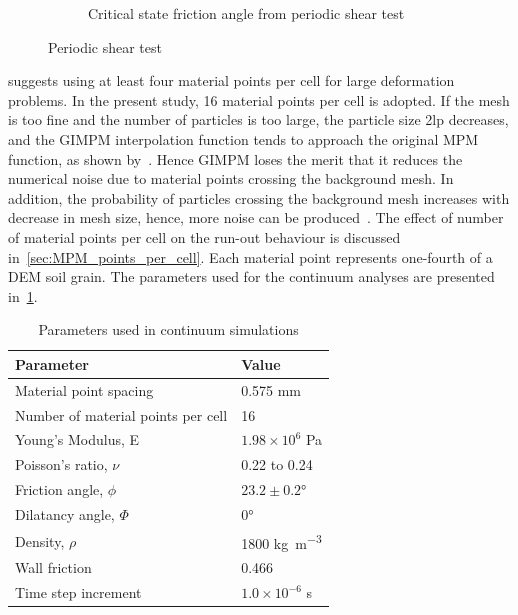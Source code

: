\begin{figure}
\begin{subfigure}[b]{0.575\textwidth}
\caption{Critical state friction angle from periodic shear test}
\label{fig:Sxy_vs_Syy}
\end{subfigure} 
\caption{Periodic shear test}
\label{fig:shear_test}
\end{figure}

\citet{Guilkey2003} suggests using at least four material points per cell for 
large deformation problems. In the present study, 16 material points 
per cell is adopted. If the mesh is too fine and the number of particles is too 
large, the particle size 2lp decreases, and the GIMPM interpolation function 
tends to approach the original MPM function, as shown 
by~\citet{Bardenhagen2004}. Hence GIMPM loses the merit that it reduces the 
numerical noise due to material points crossing the background mesh. In 
addition, the probability of particles crossing the background mesh increases 
with decrease in mesh size, hence, more noise can be produced~\cite{Abe2013}. 
The effect of number of material points per cell on the run-out behaviour is 
discussed in~\cref{sec:MPM_points_per_cell}. Each material point represents 
one-fourth of a DEM soil grain. The parameters used for the continuum analyses 
are presented in~\cref{table:MPMData}. 

\begin{table}
\caption{Parameters used in continuum simulations}
\label{table:MPMData}
\centering
\begin{tabular}{ll}
\toprule
\textbf{Parameter} & \textbf{Value} \\ \midrule
Material point spacing & 0.575 \si{\mm} \\
Number of material points per cell & 16 \\
Young's Modulus, E & $1.98 \times 10 ^{6}$ \si{\Pa} \\
Poisson's ratio, $\nu$ & 0.22 to 0.24 \\ 
Friction angle, $\phi$ & $23.2 \pm 0.2\si{\degree}$ \\
Dilatancy angle, $\varPhi$ & $0$\si{\degree} \\
Density, $\rho$ & 1800 \si{\kg\per\m\cubed}\\
Wall friction & 0.466 \\
Time step increment & $1.0 \times 10^{-6}$ \si{\second}\\ \bottomrule
\end{tabular}
\end{table}

